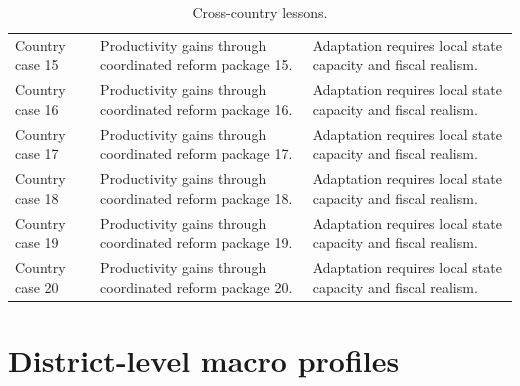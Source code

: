 \documentclass[preprint,12pt]{elsarticle}
\begin{document}
\begin{table}[h]
\begin{tabular}{p{3cm}p{5cm}p{6cm}}
Country case 15 & Productivity gains through coordinated reform package 15. & Adaptation requires local state capacity and fiscal realism. \\
Country case 16 & Productivity gains through coordinated reform package 16. & Adaptation requires local state capacity and fiscal realism. \\
Country case 17 & Productivity gains through coordinated reform package 17. & Adaptation requires local state capacity and fiscal realism. \\
Country case 18 & Productivity gains through coordinated reform package 18. & Adaptation requires local state capacity and fiscal realism. \\
Country case 19 & Productivity gains through coordinated reform package 19. & Adaptation requires local state capacity and fiscal realism. \\
Country case 20 & Productivity gains through coordinated reform package 20. & Adaptation requires local state capacity and fiscal realism. \\
\bottomrule\end{tabular}\caption{Cross-country lessons.}\end{table}
\section{District-level macro profiles}
\end{document}

